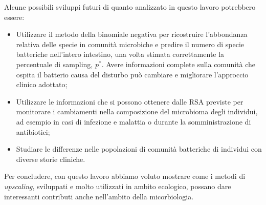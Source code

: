 Alcune possibili sviluppi futuri di quanto analizzato in questo lavoro potrebbero essere:

\begin{itemize}

    \item Utilizzare il metodo della binomiale negativa per ricostruire l'abbondanza relativa delle specie in comunità microbiche e predire il numero di specie batteriche nell'intero intestino, una volta stimata correttamente la percentuale di sampling, $p^*$. Avere informazioni complete sulla comunità che ospita il batterio causa del disturbo può cambiare e migliorare l'approccio clinico adottato;
    
    \item Utilizzare le informazioni che si possono ottenere dalle RSA previste per monitorare i cambiamenti nella composizione del microbioma degli individui, ad esempio in casi di infezione e malattia o durante la somministrazione di antibiotici;
    
    \item Studiare le differenze nelle popolazioni di comunità batteriche di individui con diverse storie cliniche.
    

\end{itemize}


Per concludere, con questo lavoro abbiamo voluto mostrare come i metodi di \emph{upscaling}, sviluppati e molto utilizzati in ambito ecologico, possano dare interessanti contributi anche nell'ambito della micorbiologia. 